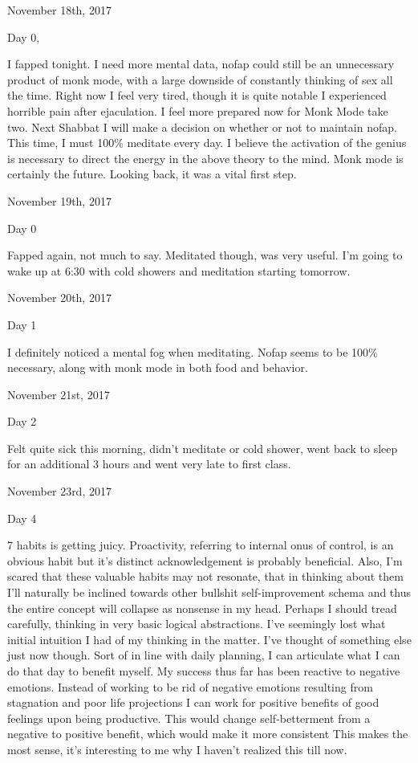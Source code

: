 \bigskip
\bigskip
November 18th, 2017

Day 0,

I fapped tonight. I need more mental data, nofap could still be an
unnecessary product of monk mode, with a large downside of constantly
thinking of sex all the time. Right now I feel very tired, though it is
quite notable I experienced horrible pain after ejaculation. I feel more
prepared now for Monk Mode take two. Next Shabbat I will make a decision
on whether or not to maintain nofap. This time, I must 100\% meditate
every day. I believe the activation of the genius is necessary to direct
the energy in the above theory to the mind. Monk mode is certainly the
future. Looking back, it was a vital first step.

\bigskip
\bigskip
November 19th, 2017

Day 0

Fapped again, not much to say. Meditated though, was very useful. I'm
going to wake up at 6:30 with cold showers and meditation starting
tomorrow.

\bigskip
\bigskip
November 20th, 2017

Day 1

I definitely noticed a mental fog when meditating. Nofap seems to be
100\% necessary, along with monk mode in both food and behavior.

\bigskip
\bigskip
November 21st, 2017

Day 2

Felt quite sick this morning, didn't meditate or cold shower, went back
to sleep for an additional 3 hours and went very late to first class.

\bigskip
\bigskip
November 23rd, 2017

Day 4

7 habits is getting juicy. Proactivity, referring to internal onus of
control, is an obvious habit but it's distinct acknowledgement is
probably beneficial. Also, I'm scared that these valuable habits may not
resonate, that in thinking about them I'll naturally be inclined towards
other bullshit self-improvement schema and thus the entire concept will
collapse as nonsense in my head. Perhaps I should tread carefully,
thinking in very basic logical abstractions. I've seemingly lost what
initial intuition I had of my thinking in the matter. I've thought of
something else just now though. Sort of in line with daily planning, I
can articulate what I can do that day to benefit myself. My success thus
far has been reactive to negative emotions. Instead of working to be rid
of negative emotions resulting from stagnation and poor life projections
I can work for positive benefits of good feelings upon being productive.
This would change self-betterment from a negative to positive benefit,
which would make it more consistent This makes the most sense, it's
interesting to me why I haven't realized this till now.

